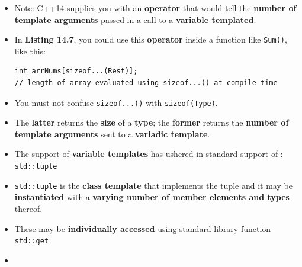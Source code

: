 \documentclass[10pt]{article}
\newcommand{\pbreak}{\vspace{30pt}}
\newcommand{\vocab}[1]{\fbox{\textbf{\textit{#1}}}}
\begin{document}
	\pbreak
	\begin{tcolorbox}
		\begin{itemize}
			\item Note: C++14 supplies you with an \textbf{operator} that would tell the \textbf{number of template arguments} passed in a call to a \textbf{variable templated}.

			\item In \textbf{Listing 14.7}, you could use this \textbf{operator} inside a function like \verb|Sum()|, like this:

				\begin{verbatim}
int arrNums[sizeof...(Rest)];
// length of array evaluated using sizeof...() at compile time
				\end{verbatim}

			\item You \underline{must not confuse} \verb|sizeof...()| with \verb|sizeof(Type)|.

			\item The \textbf{latter} returns the \textbf{size} of a \textbf{type}; the \textbf{former} returns the \textbf{number of template arguments} sent to a \textbf{variadic template}.
		\end{itemize}
	\end{tcolorbox}

	\newpage

	\begin{itemize}
		\item The support of \textbf{variable templates} has ushered in standard support of \vocab{tuples}: \verb|std::tuple|
		\item \verb|std::tuple| is the \textbf{class template} that implements the tuple and it may be \textbf{instantiated} with a \underline{\textbf{varying number of member elements and types}} thereof.

		\item These may be \textbf{individually accessed} using standard library function \verb|std::get|

		\item {}
	\end{itemize}

	\newpage

\newpage
\end{document}
